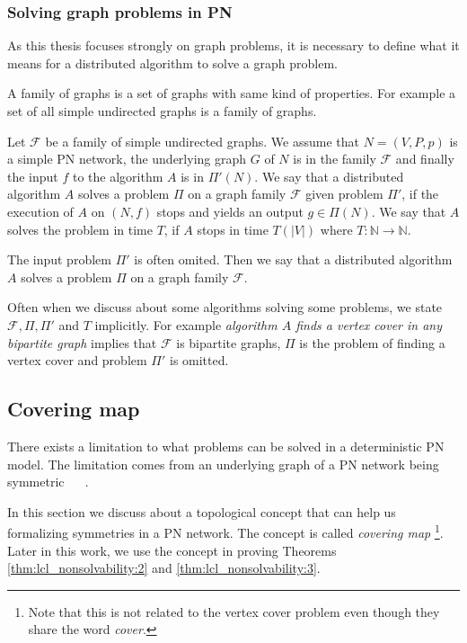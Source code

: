 
\subsubsection{Solving graph problems in PN}
As this thesis focuses strongly on graph problems, it is necessary to define what it means for a distributed algorithm to solve a graph problem.

A family of graphs is a set of graphs with same kind of properties.
For example a set of all simple undirected graphs is a family of graphs.

Let $\mathcal{F}$ be a family of simple undirected graphs.
We assume that $N=(V, P, p)$ is a simple PN network, the underlying graph $G$ of $N$ is in the family $\mathcal{F}$ and finally the input $f$ to the algorithm $A$ is in $\Pi'(N)$.
We say that a distributed algorithm $A$ solves a problem $\Pi$ on a graph family $\mathcal{F}$ given problem $\Pi'$, if the execution of $A$ on $(N, f)$ stops and yields an output $g \in \Pi(N)$.
We say that $A$ solves the problem in time $T$, if $A$ stops in time $T(|V|)$ where $T\colon \mathbb{N} \rightarrow \mathbb{N}$.

The input problem $\Pi'$ is often omited.
Then we say that a distributed algorithm $A$ solves a problem $\Pi$ on a graph family $\mathcal{F}$.

Often when we discuss about some algorithms solving some problems, we state $\mathcal{F}, \Pi, \Pi'$ and $T$ implicitly.
For example \emph{algorithm $A$ finds a vertex cover in any bipartite graph} implies that $\mathcal{F}$ is bipartite graphs, $\Pi$ is the problem of finding a vertex cover and problem $\Pi'$ is omitted.



\subsection{Covering map}
There exists a limitation to what problems can be solved in a deterministic PN model.
The limitation comes from an underlying graph of a PN network being symmetric~%
\cite{DBLP:conf/focs/Linial87}~%
\cite{DBLP:journals/siamcomp/Linial92}.

In this section we discuss about a topological concept that can help us formalizing symmetries in a PN network.
The concept is called \emph{covering map}
\footnote{Note that this is not related to the vertex cover problem even though they share the word \emph{cover}.}.
Later in this work, we use the concept in proving Theorems \ref{thm:lcl_nonsolvability:2} and \ref{thm:lcl_nonsolvability:3}.

